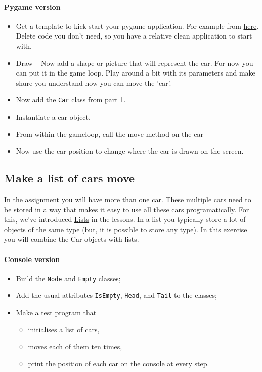 \documentclass[12pt,a4paper,final]{article}
\begin{document}
			\paragraph*{Pygame version}
			\begin{itemize}
				\item Get a template to kick-start your pygame application.
				For example from \href{http://openbookproject.net/thinkcs/python/english3e/pygame.html}{here}.
				Delete code you don't need, so you have a relative clean application to start with.
				\item Draw -- Now add a shape or picture that will represent the car.
				For now you can put it in the game loop.
				Play around a bit with its parameters and make shure you understand how you can move the 'car'.
				\item Now add the \texttt{Car} class from part 1.
				\item Instantiate a car-object.
				\item From within the gameloop, call the move-method on the car
				\item Now use the car-position to change where the car is drawn on the screen.
			\end{itemize}
			
		
		
		\subsection{Make a list of cars move}
			In the assignment you will have more than one car.
			These multiple cars need to be stored in a way that makes it easy to use all these cars programatically.
			For this, we've introduced \href{https://github.com/hogeschool/INFDEV02-2/raw/master/Slides/Lecture%20II%20-%20lists.pdf}{Lists} in the lessons.
				In a list you typically store a lot of objects of the same type (but, it is possible to store any type).
				In this exercise you will combine the Car-objects with lists.
			\paragraph*{Console version}
			\begin{itemize}
				\item Build the \texttt{Node} and \texttt{Empty} classes;
				\item Add the usual attributes \texttt{IsEmpty}, \texttt{Head}, and \texttt{Tail} to the classes;
				\item Make a test program that
				\begin{itemize}
					\item initialises a list of cars,
					\item moves each of them ten times,
					\item print the position of each car on the console at every step.
				\end{itemize}
			\end{itemize}
			
\end{document}
